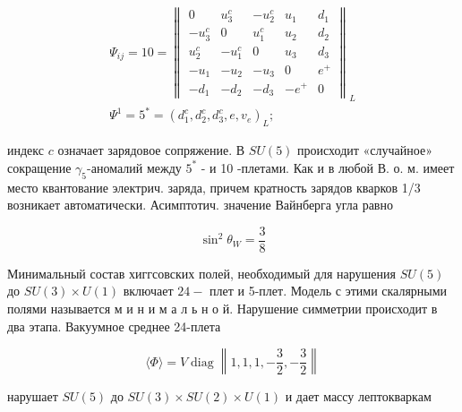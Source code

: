 \documentclass[10pt]{article}
\begin{document}
\[

\begin{gathered}

\Psi_{i j}=10=\left\|\begin{array}{ccccc}

0 & u_{3}^{c} & -u_{2}^{c} & u_{1} & d_{1} \\

-u_{3}^{c} & 0 & u_{1}^{c} & u_{2} & d_{2} \\

u_{2}^{c} & -u_{1}^{c} & 0 & u_{3} & d_{3} \\

-u_{1} & -u_{2} & -u_{3} & 0 & e^{+} \\

-d_{1} & -d_{2} & -d_{3} & -e^{+} & 0

\end{array}\right\|_{L} \\

\Psi^{1}=5^{*}=\left(d_{1}^{c}, d_{2}^{c}, d_{3}^{c}, e, v_{e}\right)_{L} ;

\end{gathered}

\]



индекс $c$ означает зарядовое сопряжение. В $S U(5)$ происходит «случайное» сокращение $\gamma_{5}$-аномалий между $5^{*}$ - и 10 -плетами. Как и в любой В. о. м. имеет место квантование электрич. заряда, причем кратность зарядов кварков 1/3 возникает автоматически. Асимптотич. значение Вайнберга угла равно



\[

\sin ^{2} \theta_{W}=\frac{3}{8}

\]



Минимальный состав хиггсовских полей, необходимый для нарушения $S U(5)$ до $S U(3) \times U(1)$ включает $24-$ плет и 5-плет. Модель с этими скалярными полями называется м и н и м а л ь н о й. Нарушение симметрии происходит в два этапа. Вакуумное среднее 24-плета



\[

\langle\Phi\rangle=V \operatorname{diag}\left\|1,1,1,-\frac{3}{2},-\frac{3}{2}\right\|

\]



нарушает $S U(5)$ до $S U(3) \times S U(2) \times U(1)$ и дает массу лептокваркам
\end{document}
